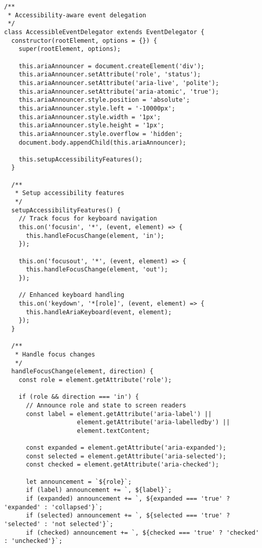 \documentclass[11pt]{article}
\begin{document}
\begin{verbatim}
/**
 * Accessibility-aware event delegation
 */
class AccessibleEventDelegator extends EventDelegator {
  constructor(rootElement, options = {}) {
    super(rootElement, options);
    
    this.ariaAnnouncer = document.createElement('div');
    this.ariaAnnouncer.setAttribute('role', 'status');
    this.ariaAnnouncer.setAttribute('aria-live', 'polite');
    this.ariaAnnouncer.setAttribute('aria-atomic', 'true');
    this.ariaAnnouncer.style.position = 'absolute';
    this.ariaAnnouncer.style.left = '-10000px';
    this.ariaAnnouncer.style.width = '1px';
    this.ariaAnnouncer.style.height = '1px';
    this.ariaAnnouncer.style.overflow = 'hidden';
    document.body.appendChild(this.ariaAnnouncer);
    
    this.setupAccessibilityFeatures();
  }
  
  /**
   * Setup accessibility features
   */
  setupAccessibilityFeatures() {
    // Track focus for keyboard navigation
    this.on('focusin', '*', (event, element) => {
      this.handleFocusChange(element, 'in');
    });
    
    this.on('focusout', '*', (event, element) => {
      this.handleFocusChange(element, 'out');
    });
    
    // Enhanced keyboard handling
    this.on('keydown', '*[role]', (event, element) => {
      this.handleAriaKeyboard(event, element);
    });
  }
  
  /**
   * Handle focus changes
   */
  handleFocusChange(element, direction) {
    const role = element.getAttribute('role');
    
    if (role && direction === 'in') {
      // Announce role and state to screen readers
      const label = element.getAttribute('aria-label') || 
                    element.getAttribute('aria-labelledby') ||
                    element.textContent;
      
      const expanded = element.getAttribute('aria-expanded');
      const selected = element.getAttribute('aria-selected');
      const checked = element.getAttribute('aria-checked');
      
      let announcement = `${role}`;
      if (label) announcement += `, ${label}`;
      if (expanded) announcement += `, ${expanded === 'true' ? 'expanded' : 'collapsed'}`;
      if (selected) announcement += `, ${selected === 'true' ? 'selected' : 'not selected'}`;
      if (checked) announcement += `, ${checked === 'true' ? 'checked' : 'unchecked'}`;
      

\end{verbatim}
\end{document}

